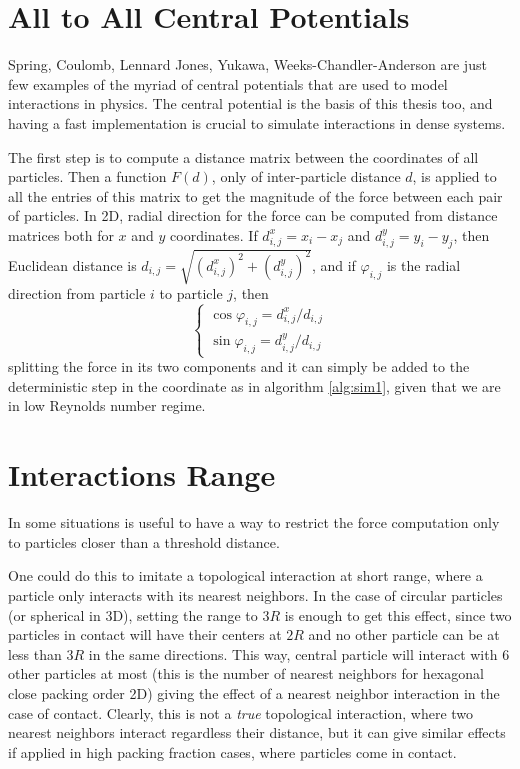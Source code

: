 \documentclass[../../master_thesis_np.tex]{subfiles}
\begin{document}
	\section{All to All Central Potentials}
	Spring, Coulomb, Lennard Jones, Yukawa, Weeks-Chandler-Anderson are just few examples of the myriad of central potentials that are used to model interactions in physics. The central potential is the basis of this thesis too, and having a fast implementation is crucial to simulate interactions in dense systems. 
	
	The first step is to compute a distance matrix between the coordinates of all particles. Then a function $F(d)$, only of inter-particle distance $d$, is applied to all the entries of this matrix to get the magnitude of the force between each pair of particles. In 2D, radial direction for the force can be computed from distance matrices both for $x$ and $y$ coordinates. If $d^x_{i,j} = x_i - x_j$ and $d^y_{i,j} = y_i - y_j$, then Euclidean distance is $d_{i,j} = \sqrt{(d^x_{i,j})^2 + (d^y_{i,j})^2}$, and if $\varphi_{i,j}$ is the radial direction from particle $i$ to particle $j$, then
	\begin{equation}
		\begin{cases}
			\cos\varphi_{i,j} = d^x_{i,j}/d_{i,j}\\
			\sin\varphi_{i,j} = d^y_{i,j}/d_{i,j}
		\end{cases}
	\end{equation}
	splitting the force in its two components and it can simply be added to the deterministic step in the coordinate as in algorithm \ref{alg:sim1}, given that we are in low Reynolds number regime. 
	
	\section{Interactions Range} \label{intrange}
	In some situations is useful to have a way to restrict the force computation only to particles closer than a threshold distance.
	
	One could do this to imitate a topological interaction at short range, where a particle only interacts with its nearest neighbors. In the case of circular particles (or spherical in 3D), setting the range to $3R$ is enough to get this effect, since two particles in contact will have their centers at $2R$ and no other particle can be at less than $3R$ in the same directions. This way, central particle will interact with 6 other particles at most (this is the number of nearest neighbors for hexagonal close packing order 2D) giving the effect of a nearest neighbor interaction in the case of contact. Clearly, this is not a \emph{true} topological interaction, where two nearest neighbors interact regardless their distance, but it can give similar effects if applied in high packing fraction cases, where particles come in contact.
	
\end{document}
